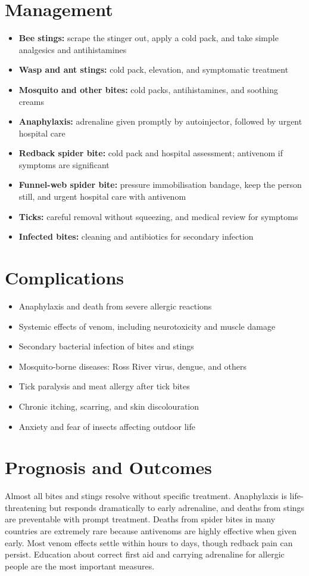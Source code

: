 \section*{Management}
\begin{itemize}
    \item \textbf{Bee stings:} scrape the stinger out, apply a cold pack, and take simple analgesics and antihistamines
    \item \textbf{Wasp and ant stings:} cold pack, elevation, and symptomatic treatment
    \item \textbf{Mosquito and other bites:} cold packs, antihistamines, and soothing creams
    \item \textbf{Anaphylaxis:} adrenaline given promptly by autoinjector, followed by urgent hospital care
    \item \textbf{Redback spider bite:} cold pack and hospital assessment; antivenom if symptoms are significant
    \item \textbf{Funnel-web spider bite:} pressure immobilisation bandage, keep the person still, and urgent hospital care with antivenom
    \item \textbf{Ticks:} careful removal without squeezing, and medical review for symptoms
    \item \textbf{Infected bites:} cleaning and antibiotics for secondary infection
\end{itemize}

\section*{Complications}
\begin{itemize}
    \item Anaphylaxis and death from severe allergic reactions
    \item Systemic effects of venom, including neurotoxicity and muscle damage
    \item Secondary bacterial infection of bites and stings
    \item Mosquito-borne diseases: Ross River virus, dengue, and others
    \item Tick paralysis and meat allergy after tick bites
    \item Chronic itching, scarring, and skin discolouration
    \item Anxiety and fear of insects affecting outdoor life
\end{itemize}

\section*{Prognosis and Outcomes}
Almost all bites and stings resolve without specific treatment. Anaphylaxis is life-threatening but responds dramatically to early adrenaline, and deaths from stings are preventable with prompt treatment. Deaths from spider bites in many countries are extremely rare because antivenoms are highly effective when given early. Most venom effects settle within hours to days, though redback pain can persist. Education about correct first aid and carrying adrenaline for allergic people are the most important measures.

